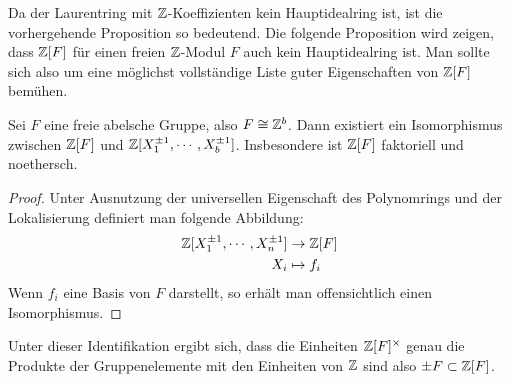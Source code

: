 Da der Laurentring mit $\mathbb{Z}$-Koeffizienten kein Hauptidealring ist, ist die vorhergehende Proposition so bedeutend. Die folgende Proposition wird zeigen, dass $\mathbb{Z}[F]$ für einen freien $\mathbb{Z}$-Modul $F$ auch kein Hauptidealring ist. Man sollte sich also um eine möglichst vollständige Liste guter Eigenschaften von $\mathbb{Z}[F]$ bemühen.

\begin{prop}
\label{prop:gruppenringnoethersch}
	Sei $F$ eine freie abelsche Gruppe, also $F\cong \mathbb{Z}^b$. Dann existiert ein Isomorphismus zwischen $\mathbb{Z}[F]$ und $\mathbb{Z}[X_1^{\pm 1},\cdots,X_{b}^{\pm 1}]$. Insbesondere ist $\mathbb{Z}[F]$ faktoriell und noethersch.
\end{prop}
\begin{proof}
	Unter Ausnutzung der universellen Eigenschaft des Polynomrings und der Lokalisierung definiert man folgende Abbildung:
	\begin{align*}
			\mathbb{Z}[X_1^{\pm 1},\cdots,X_{n}^{\pm 1}] & \to  \mathbb{Z}[F]\\
			X_i &\mapsto  f_i
	\end{align*}
	Wenn $f_i$ eine Basis von $F$ darstellt, so erhält man offensichtlich einen Isomorphismus.
\end{proof}

\begin{bem}
\label{bem:einheitengruppenring}
	Unter dieser Identifikation ergibt sich, dass die Einheiten $\mathbb{Z}[F]^\times$ genau die Produkte der Gruppenelemente mit den Einheiten von $\mathbb{Z}$ sind also $\pm F \subset \mathbb{Z}[F]$.
\end{bem}

